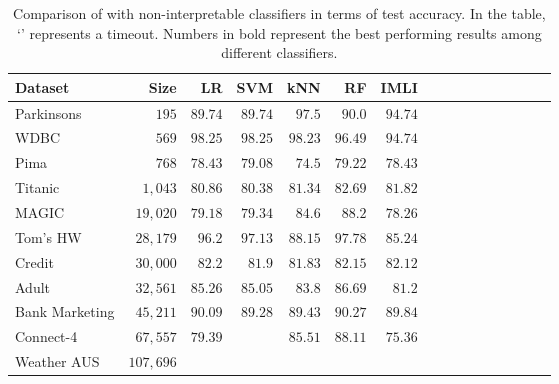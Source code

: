 \begin{table}[!t]        
	\centering
	\caption{Comparison of {\imli} with non-interpretable classifiers in terms of test accuracy. In the table, `\textemdash' represents a timeout. Numbers in bold represent the best performing results among different classifiers.}
	\label{interpretability_imli_table:non_interpretable_classifiers}
	\small
	\begin{tabular}{lrrrrrrrrrrrrrrr}
		
		
		
		
		\toprule
		Dataset & Size & LR & SVM & kNN & RF & IMLI \\
		
		\midrule
		\multirow{1}{*}{Parkinsons} & \multirow{1}{*}{ $ 195 $ }  &
		$ 89.74 $  &  $ 89.74 $  &  $ \mathbf{97.5} $  &  $ 90.0 $  &  $ 94.74 $  \\
		\multirow{1}{*}{WDBC} & \multirow{1}{*}{ $ 569 $ }  &
		$ \mathbf{98.25} $  &  $ \mathbf{98.25} $  &  $ 98.23 $  &  $ 96.49 $  &  $ 94.74 $  \\
		\multirow{1}{*}{Pima} & \multirow{1}{*}{ $ 768 $ }  &
		$ 78.43 $  &  $ 79.08 $  &  $ 74.5 $  &  $ \mathbf{79.22} $  &  $ 78.43 $  \\
		\multirow{1}{*}{Titanic} & \multirow{1}{*}{ $ 1,043 $ }  &
		$ 80.86 $  &  $ 80.38 $  &  $ 81.34 $  &  $ \mathbf{82.69} $  &  $ 81.82 $  \\
		\multirow{1}{*}{MAGIC} & \multirow{1}{*}{ $ 19,020 $ }  &
		$ 79.18 $  &  $ 79.34 $  &  $ 84.6 $  &  $ \mathbf{88.2} $  &  $ 78.26 $  \\
		\multirow{1}{*}{Tom's HW} & \multirow{1}{*}{ $ 28,179 $ }  &
		$ 96.2 $  &  $ 97.13 $  &  $ 88.15 $  &  $ \mathbf{97.78} $  &  $ 85.24 $  \\
		\multirow{1}{*}{Credit} & \multirow{1}{*}{ $ 30,000 $ }  &
		$ \mathbf{82.2} $  &  $ 81.9 $  &  $ 81.83 $  &  $ 82.15 $  &  $ 82.12 $  \\
		\multirow{1}{*}{Adult} & \multirow{1}{*}{ $ 32,561 $ }  &
		$ 85.26 $  &  $ 85.05 $  &  $ 83.8 $  &  $ \mathbf{86.69} $  &  $ 81.2 $  \\
		\multirow{1}{*}{Bank Marketing} & \multirow{1}{*}{ $ 45,211 $ }  &
		$ 90.09 $  &  $ 89.28 $  &  $ 89.43 $  &  $ \mathbf{90.27} $  &  $ 89.84 $  \\
		\multirow{1}{*}{Connect-4} & \multirow{1}{*}{ $ 67,557 $ }  &
		$ 79.39 $  & \textemdash &  $ 85.51 $  &  $ \mathbf{88.11} $  &  $ 75.36 $  \\
		\multirow{1}{*}{Weather AUS} & \multirow{1}{*}{ $ 107,696 $ }  &

\end{tabular}
\end{table}
